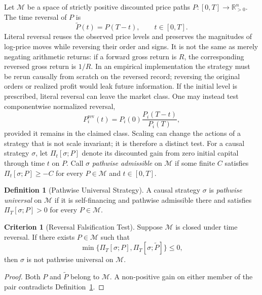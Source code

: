 \documentclass[aps,pra,reprint,superscriptaddress,amsmath,amssymb,floatfix]{revtex4-2}
\theoremstyle{plain}
\theoremstyle{definition}
\newtheorem{definition}{Definition}
\newtheorem{criterion}{Criterion}
\theoremstyle{remark}
\begin{document}
Let \(\mathcal{M}\) be a space of strictly positive discounted price paths
\(P\colon[0,T]\to\mathbb{R}_{>0}^n\). The time reversal of \(P\) is
\begin{equation}
  \widetilde{P}(t)=P(T-t), \qquad t\in[0,T].
  \label{eq:timereversal}
\end{equation}
Literal reversal reuses the observed price levels and preserves the magnitudes
of log-price moves while reversing their order and signs. It is not the same
as merely negating arithmetic returns: if a forward gross return is \(R\), the
corresponding reversed gross return is \(1/R\). In an empirical implementation
the strategy must be rerun causally from scratch on the reversed record;
reversing the original orders or realized profit would leak future information.
If the initial level is prescribed, literal reversal can leave the market
class. One may instead test componentwise normalized reversal,
\[
  P_i^{\mathrm{rev}}(t)=P_i(0)\frac{P_i(T-t)}{P_i(T)},
\]
provided it remains in the claimed class. Scaling can change the actions of a
strategy that is not scale invariant; it is therefore a distinct test.
For a causal strategy \(\sigma\), let \(\Pi_t[\sigma;P]\) denote its discounted
gain from zero initial capital through time \(t\) on \(P\). Call \(\sigma\)
\emph{pathwise admissible} on \(\mathcal M\) if some finite \(C\) satisfies
\(\Pi_t[\sigma;P]\geq-C\) for every \(P\in\mathcal M\) and
\(t\in[0,T]\).

\begin{definition}[Pathwise Universal Strategy]
\label{def:universal}
  A causal strategy \(\sigma\) is \emph{pathwise universal} on
  \(\mathcal{M}\) if it is self-financing and pathwise admissible there and
  satisfies \(\Pi_T[\sigma;P]>0\) for every \(P\in\mathcal{M}\).
\end{definition}

\begin{criterion}[Reversal Falsification Test]
  \label{crit:tr}
  Suppose \(\mathcal{M}\) is closed under time reversal. If there exists
  \(P\in\mathcal{M}\) such that
  \begin{equation}
    \min\{\Pi_T[\sigma;P],\Pi_T[\sigma;\widetilde P]\}\leq 0,
    \label{eq:reversaltest}
  \end{equation}
  then \(\sigma\) is not pathwise universal on \(\mathcal{M}\).
\end{criterion}

\begin{proof}
Both \(P\) and \(\widetilde P\) belong to \(\mathcal{M}\). A non-positive gain
on either member of the pair contradicts Definition~\ref{def:universal}.
\end{proof}
\end{document}
